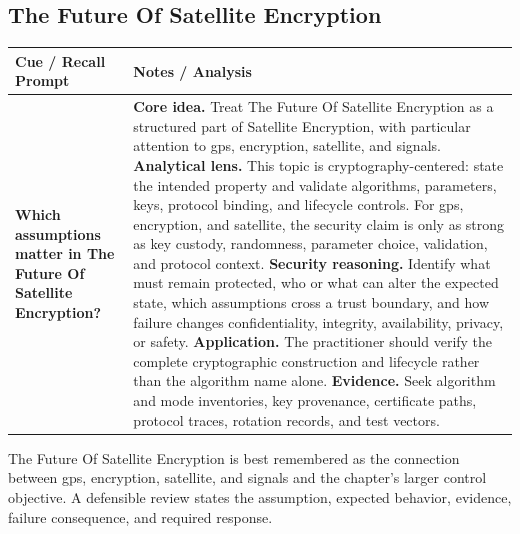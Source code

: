 \documentclass[11pt]{article}
\newcommand{\CornellHeader}{%
\rowcolor{Navy}\color{white}\bfseries Cue / Recall Prompt & \color{white}\bfseries Notes / Analysis\\\hline}
\newcommand{\CornellRow}[2]{%
\cellcolor{CueGray}\RaggedRight\textbf{#1} & \RaggedRight #2\\\hline}
\begin{document}
\subsection*{The Future Of Satellite Encryption}
\begin{longtable}{>{\RaggedRight\arraybackslash}p{}|>{\RaggedRight\arraybackslash}p{}}
\CornellHeader
\CornellRow{Which assumptions matter in The Future Of Satellite Encryption?}{\textbf{Core idea.} Treat The Future Of Satellite Encryption as a structured part of Satellite Encryption, with particular attention to gps, encryption, satellite, and signals. \textbf{Analytical lens.} This topic is cryptography-centered: state the intended property and validate algorithms, parameters, keys, protocol binding, and lifecycle controls. For gps, encryption, and satellite, the security claim is only as strong as key custody, randomness, parameter choice, validation, and protocol context. \textbf{Security reasoning.} Identify what must remain protected, who or what can alter the expected state, which assumptions cross a trust boundary, and how failure changes confidentiality, integrity, availability, privacy, or safety. \textbf{Application.} The practitioner should verify the complete cryptographic construction and lifecycle rather than the algorithm name alone. \textbf{Evidence.} Seek algorithm and mode inventories, key provenance, certificate paths, protocol traces, rotation records, and test vectors.}
\end{longtable}
\begin{topicsummary}
The Future Of Satellite Encryption is best remembered as the connection between gps, encryption, satellite, and signals and the chapter's larger control objective. A defensible review states the assumption, expected behavior, evidence, failure consequence, and required response.
\end{topicsummary}
\end{document}
